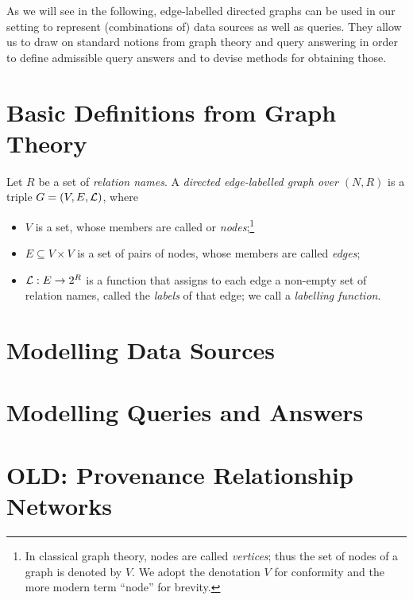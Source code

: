As we will see in the following, edge-labelled directed graphs can be used in our setting
to represent (combinations of) data sources as well as queries.
They allow us to draw on standard notions from graph theory and query answering
in order to define admissible query answers and to devise methods for obtaining those.

\section{Basic Definitions from Graph Theory}

\begin{definition}
  Let $R$ be a set of \emph{relation names}.
  A \emph{directed edge-labelled graph over $(N,R)$} is a triple $G = (V,E,\mathcal{L})$,
  where
  \begin{itemize}
    \item
    $V$ is a set, whose members are called or \emph{nodes};\footnote{%
      In classical graph theory, nodes are called \emph{vertices}; thus the set of
      nodes of a graph is denoted by $V$. We adopt the denotation $V$ for conformity
      and the more modern term ``node'' for brevity.%
    }      
    \item 
    $E \subseteq V \times V$ is a set of pairs of nodes, whose members are called \emph{edges};
    \item
    $\mathcal{L} : E \to 2^R$ is a function that assigns to each edge a non-empty set of relation names,
    called the \emph{labels} of that edge; we call \Lmc a \emph{labelling function}.
  \end{itemize}
\end{definition}
%


\section{Modelling Data Sources}

\section{Modelling Queries and Answers}


\section{OLD: Provenance Relationship Networks}

